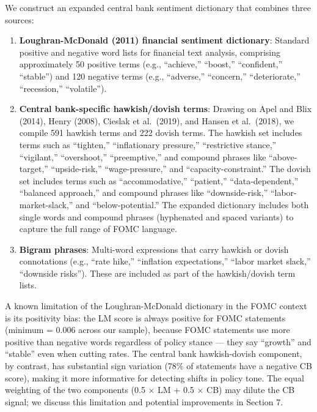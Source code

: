 \documentclass[12pt]{article}
\begin{document}
We construct an expanded central bank sentiment dictionary that combines
three sources:

\begin{enumerate}
\def\labelenumi{\arabic{enumi}.}
\item
  \textbf{Loughran-McDonald (2011) financial sentiment dictionary}:
  Standard positive and negative word lists for financial text analysis,
  comprising approximately 50 positive terms (e.g., ``achieve,''
  ``boost,'' ``confident,'' ``stable'') and 120 negative terms (e.g.,
  ``adverse,'' ``concern,'' ``deteriorate,'' ``recession,''
  ``volatile'').
\item
  \textbf{Central bank-specific hawkish/dovish terms}: Drawing on Apel
  and Blix (2014), Henry (2008), Cieslak et al.~(2019), and Hansen et
  al.~(2018), we compile 591 hawkish terms and 222 dovish terms. The
  hawkish set includes terms such as ``tighten,'' ``inflationary
  pressure,'' ``restrictive stance,'' ``vigilant,'' ``overshoot,''
  ``preemptive,'' and compound phrases like ``above-target,''
  ``upside-risk,'' ``wage-pressure,'' and ``capacity-constraint.'' The
  dovish set includes terms such as ``accommodative,'' ``patient,''
  ``data-dependent,'' ``balanced approach,'' and compound phrases like
  ``downside-risk,'' ``labor-market-slack,'' and ``below-potential.''
  The expanded dictionary includes both single words and compound
  phrases (hyphenated and spaced variants) to capture the full range of
  FOMC language.
\item
  \textbf{Bigram phrases}: Multi-word expressions that carry hawkish or
  dovish connotations (e.g., ``rate hike,'' ``inflation expectations,''
  ``labor market slack,'' ``downside risks''). These are included as
  part of the hawkish/dovish term lists.
\end{enumerate}

A known limitation of the Loughran-McDonald dictionary in the FOMC
context is its positivity bias: the LM score is always positive for FOMC
statements (minimum = 0.006 across our sample), because FOMC statements
use more positive than negative words regardless of policy stance ---
they say ``growth'' and ``stable'' even when cutting rates. The central
bank hawkish-dovish component, by contrast, has substantial sign
variation (78\% of statements have a negative CB score), making it more
informative for detecting shifts in policy tone. The equal weighting of
the two components (0.5 × LM + 0.5 × CB) may dilute the CB signal; we
discuss this limitation and potential improvements in Section 7.
\end{document}
